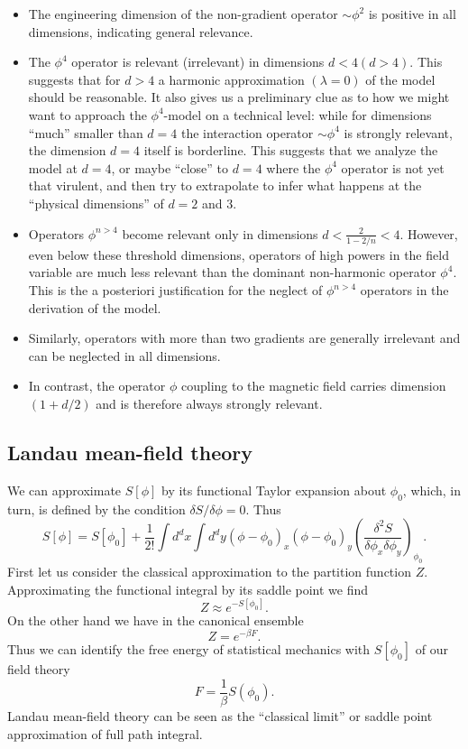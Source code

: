 \begin{itemize}
\item The engineering dimension of the non-gradient operator $\sim \phi^2$ is positive in all dimensions, indicating general relevance.
\item The $\phi^4$ operator is relevant (irrelevant) in dimensions $d < 4 (d > 4)$. This suggests that for $d > 4$ a harmonic approximation $(\lambda = 0)$ of the model should be reasonable. 
It also gives us a preliminary clue as to how we might want to approach the $\phi^4$-model on a technical level: 
while for dimensions ``much'' smaller than $d = 4$ the interaction operator $\sim \phi^4$ is strongly relevant, the dimension $d = 4$ itself is borderline. 
This suggests that we analyze the model at $d = 4$, or maybe ``close''  to $d = 4$ where the $\phi^4$ operator is not yet that virulent, and then try to extrapolate to infer what happens at the ``physical dimensions'' of $d = 2$ and $3$.
\item Operators $\phi^{n > 4}$ become relevant only in dimensions $d < \frac{2}{1-2/n} < 4$. 
However, even below these threshold dimensions, operators of high powers in the field variable are much less relevant than the dominant non-harmonic operator $\phi^4$. This is the a posteriori justification for the neglect of $\phi^{n>4}$ operators in the derivation of the model.
\item Similarly, operators with more than two gradients are generally irrelevant and can be neglected in all dimensions.
\item In contrast, the operator $\phi$ coupling to the magnetic field carries dimension $(1+d/2)$ and is therefore always strongly relevant.
\end{itemize}

\subsection{Landau mean-field theory}
We can approximate $S[\phi]$ by its functional Taylor expansion about $\phi_0$, which, in turn, is defined by the condition $\delta S / \delta \phi = 0$. Thus
\[S[\phi] = S[\phi_0] + \frac{1}{2!} \int d^dx \int d^dy (\phi-\phi_0)_x (\phi-\phi_0)_y \left( \frac{\delta^2 S}{\delta \phi_x \delta \phi_y} \right)_{\phi_0}.\]
First let us consider the classical approximation to the partition function $Z$. Approximating the functional integral by its saddle point we find
\[Z \approx e^{-S[\phi_0]}.\]
On the other hand we have in the canonical ensemble
\[Z = e^{-\beta F}.\]
Thus we can identify the free energy of statistical mechanics with $S[\phi_0]$ of our field theory
\[F = \frac{1}{\beta} S(\phi_0).\]
Landau mean-field theory can be seen as the ``classical limit'' or saddle point approximation of full path integral.

